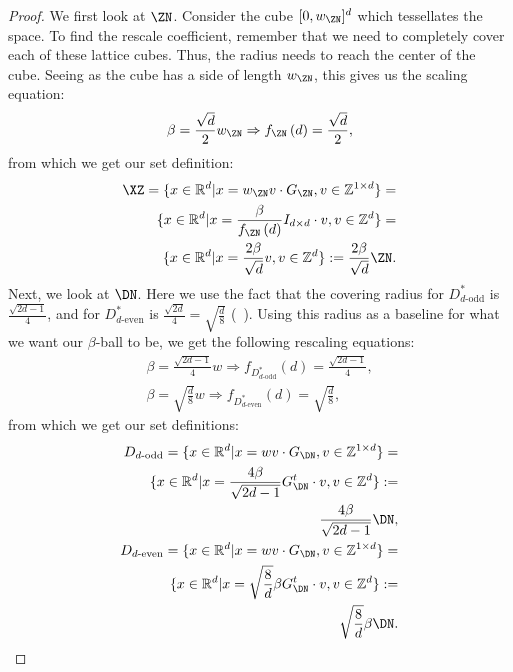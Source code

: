 \begin{proof}
     We first look at $\ZN$. Consider the cube $[0,w_{\ZN}]^d$ which tessellates the space. To find the rescale coefficient, remember that we need to completely cover each of these lattice cubes. Thus, the radius needs to reach the center of the cube. Seeing as the cube has a side of length $w_{\ZN}$, this gives us the scaling equation:
    \[
        \beta = \frac{\sqrt{d}}{2}w_{\ZN} \Rightarrow f_{\ZN}\left(d\right)=\frac{\sqrt{d}}{2},
    \]
    from which we get our set definition:
    \begin{align*}
        \XZ = \{x\in\mathbb{R}^d|x=w_{\ZN} v\cdot G_{\ZN},v\in\mathbb{Z}^{1\times d}\} = \\
        \{x\in\mathbb{R}^d|x=\frac{\beta}{f_{\ZN}\left(d\right)}I_{d\times d}\cdot v,v\in\mathbb{Z}^d\} = \\
        \{x\in\mathbb{R}^d|x=\frac{2\beta}{\sqrt{d}} v,v\in\mathbb{Z}^d\}:=\frac{2\beta}{\sqrt{d}}\ZN.
    \end{align*}
    Next, we look at $\DN$. Here we use the fact that the covering radius for $D_{d\text{-odd}}^*$ is \(\frac{\sqrt{2d-1}}{4}\), and for $D_{d\text{-even}}^*$ is \(\frac{\sqrt{2d}}{4}=\sqrt{\frac{d}{8}}\) (~\cite[page 120]{conway2013sphere}). Using this radius as a baseline for what we want our $\beta$-ball to be, we get the following rescaling equations:
    \begin{align*}
                \beta = \frac{\sqrt{2d-1}}{4}w \Rightarrow f_{D_{d\text{-odd}}^*}\left(d\right) = \frac{\sqrt{2d-1}}{4}, \\
                \beta = \sqrt{\frac{d}{8}}w \Rightarrow f_{D_{d\text{-even}}^*}\left(d\right) = \sqrt{\frac{d}{8}},
    \end{align*}
    from which we get our set definitions:
    \begin{align*}
        D_{d\text{-odd}} = \{x\in\mathbb{R}^d|x=wv\cdot G_{\DN},v\in\mathbb{Z}^{1\times d}\} = \\
        \{x\in\mathbb{R}^d|x=\frac{4\beta}{\sqrt{2d-1}}G_{\DN}^t\cdot v,v\in\mathbb{Z}^d\}:=\\
        \frac{4\beta}{\sqrt{2d-1}}\DN,\\
        D_{d\text{-even}} = \{x\in\mathbb{R}^d|x=wv\cdot G_{\DN},v\in\mathbb{Z}^{1\times d}\} = \\
        \{x\in\mathbb{R}^d|x=\sqrt{\frac{8}{d}}\beta G_{\DN}^t\cdot v,v\in\mathbb{Z}^d\}:=\\
        \sqrt{\frac{8}{d}}\beta\DN.
    \end{align*}

\end{proof}
